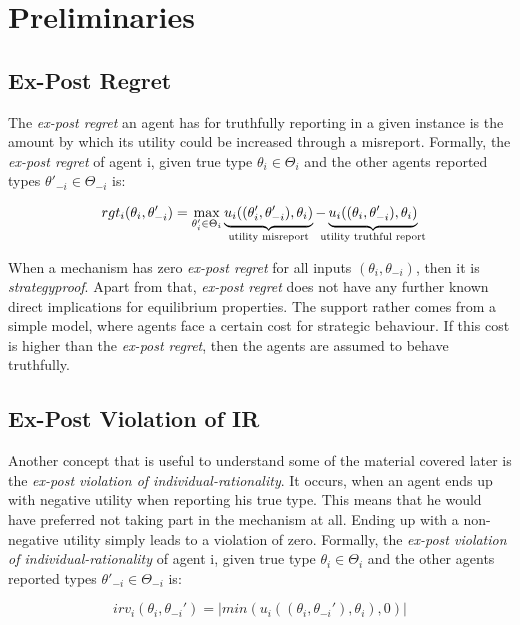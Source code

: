 \documentclass[]{article}
\begin{document}
\section{Preliminaries}
\subsection{Ex-Post Regret}
The \emph{ex-post regret} an agent has for truthfully reporting in a given instance is the amount by which its utility could be increased through a misreport. Formally, the \emph{ex-post regret} of agent i, given true type $\theta_{i} \in \Theta_{i}$ and the other agents reported types $\theta'_{-i} \in \Theta_{-i}$ is:

\begin{equation*}
rgt_{i}(\theta_{i},\theta'_{-i}) = \max\limits_{\theta'_{i} \in \Theta_{i}} 
\underbrace{u_{i}((\theta'_{i}, \theta'_{-i}), \theta_{i})}_{\mathclap{\text{utility misreport}}}
- \underbrace{u_{i}((\theta_{i}, \theta'_{-i}), \theta_{i})}_{\mathclap{\text{utility truthful report}}}
\end{equation*}

\noindent When a mechanism has zero \emph{ex-post regret} for all inputs $(\theta_{i}, \theta_{-i})$, then it is \emph{strategyproof}. Apart from that, \emph{ex-post regret} does not have any further known direct implications for equilibrium properties. The support rather comes from a simple model, where agents face a certain cost for strategic behaviour. If this cost is higher than the \emph{ex-post regret}, then the agents are assumed to behave truthfully.


\subsection{Ex-Post Violation of IR}
Another concept that is useful to understand some of the material covered later is the \emph{ex-post violation of individual-rationality}. It occurs, when an agent ends up with negative utility when reporting his true type. This means that he would have preferred not taking part in the mechanism at all. Ending up with a non-negative utility simply leads to a violation of zero. Formally, the \emph{ex-post violation of individual-rationality} of agent i, given true type $\theta_{i} \in \Theta_{i}$ and the other agents reported types $\theta'_{-i} \in \Theta_{-i}$ is:

\begin{equation*} 
irv_{i}(\theta_{i}, \theta_{-i}') = |min(u_{i}((\theta_{i}, \theta_{-i}'), \theta_{i}),0)|
\end{equation*}
\end{document}
